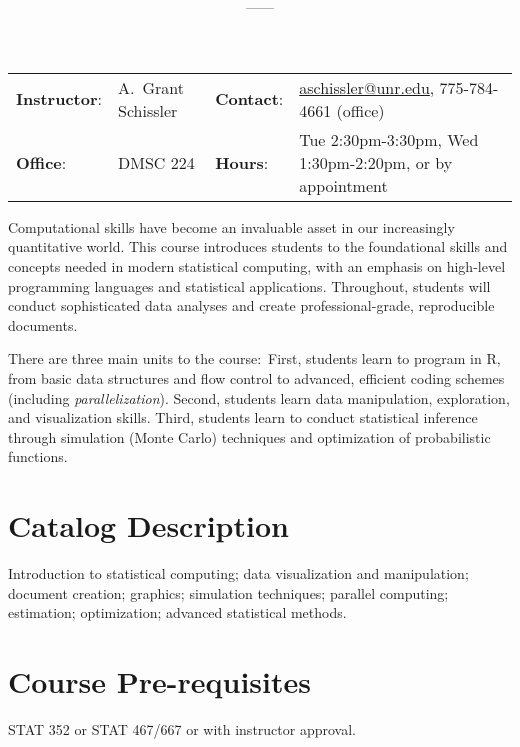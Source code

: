 \documentclass[11pt,onecolumn]{article}
\title{\textbf{\coursename}}
\author{{\semester}---{\roomnumb}---{\classtimes}}
\date{}
\makeatletter
\newcommand{\myname}{A.~Grant Schissler}
\newcommand{\myemail}{aschissler@unr.edu}
\newcommand{\office}{DMSC 224}
\newcommand{\officehours}{Tue 2:30pm-3:30pm, Wed 1:30pm-2:20pm, or by appointment}
\makeatother
\begin{document}
\maketitle

\vspace{-0.25in}
\noindent\makebox[\linewidth]{\rule{\textwidth}{1pt}}

\begin{center}
\begin{tabular}{llll}
\textbf{Instructor}:&\myname & \textbf{Contact}:&\href{mailto:\myemail}{\myemail}, 775-784-4661 (office)\\
\textbf{Office}:&\office & \textbf{Hours}:&\officehours\\
\end{tabular}
\end{center}

Computational skills have become an invaluable asset in our increasingly quantitative world. This course introduces students to the foundational skills and concepts needed in modern statistical computing, with an emphasis on high-level programming languages and statistical applications. Throughout, students will conduct sophisticated data analyses and create professional-grade, reproducible documents.

There are three main units to the course:~First, students learn to program in R, from basic data structures and flow control to advanced, efficient coding schemes (including \textit{parallelization}). Second, students learn data manipulation, exploration, and visualization skills. Third, students learn to conduct statistical inference through simulation (Monte Carlo) techniques and optimization of probabilistic functions.

\section*{Catalog Description}
Introduction to statistical computing; data visualization and manipulation; document creation; graphics; simulation techniques; parallel computing; estimation; optimization; advanced statistical methods.

\section*{Course Pre-requisites}
STAT 352 or STAT 467/667 or with instructor approval.
\end{document}
